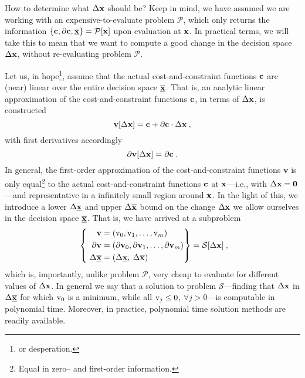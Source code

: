 \documentclass[11pt]{article}
\begin{document}
How to determine what $\Delta \mathbf{x}$ should be? Keep in mind, we have assumed we are working with an expensive-to-evaluate problem $\mathcal{P}$, which only returns the information $\left\{\mathbf{c}, \partial \mathbf{c}, \underline{\overline{\mathbf{x}}}\right\}=\mathcal{P}[\mathbf{x}]$ upon evaluation at $\mathbf{x}$. In practical terms, we will take this to mean that we want to compute a good change in the decision space $\Delta \mathbf{x}$, without re-evaluating problem $\mathcal{P}$.

Let us, in hope\footnote{or desperation.}, assume that the actual cost-and-constraint functions $\mathbf{c}$ are (near) linear over the entire decision space $\underline{\overline{\mathbf{x}}}$. That is, an analytic linear approximation of the cost-and-constraint functions $\mathbf{c}$, in terms of $\Delta \mathbf{x}$, is constructed
\begin{equation}
\textbf{v}[\Delta \mathbf{x}] = \mathbf{c} + \partial \mathbf{c} \cdot  \Delta \mathbf{x}   \:,
\end{equation}
with first derivatives accordingly
\begin{equation}
\partial \textbf{v}[\Delta \mathbf{x}] = \partial \mathbf{c} \:.
\end{equation}
In general, the first-order approximation of the cost-and-constraint functions $\textbf{v}$ is only equal\footnote{Equal in zero-- and first-order information.} to the actual cost-and-constraint functions $\mathbf{c}$ at $\mathbf{x}$---i.e., with $\Delta \mathbf{x}=\textbf{0}$---and representative in a infinitely small region around $\mathbf{x}$. In the light of this, we introduce a lower $\Delta \underline{\mathbf{x}}$ and upper $\Delta \overline{\mathbf{x}}$ bound on the change $\Delta \mathbf{x}$ we allow ourselves in the decision space $\underline{\overline{\mathbf{x}}}$.
That is, we have arrived at a subproblem 
\begin{align}
\label{d:eqn:p}
 ~\left\{ ~
\begin{aligned}
\mathbf{v} &= (\textrm{v}_0, \textrm{v}_1, \ldots, \textrm{v}_m ) \\
\mathbf{\partial v} & = (\mathbf{\partial v}_0 , \mathbf{\partial v}_1 , \ldots,\mathbf{\partial v}_m  ) \\
\Delta \underline{\overline{\mathbf{x}}} & = ( \Delta \underline{\mathbf{x}} , \: \Delta \overline{\mathbf{x}} ) \:
\end{aligned}\right\} =
\mathcal{S} [\Delta \mathbf{x}] \: ,
\end{align}
which is, importantly, unlike problem $\mathcal{P}$, very cheap to evaluate for different values of $\Delta \mathbf{x}$. In general we say that a solution to problem $\mathcal{S}$---finding that $\Delta \mathbf{x}$ in $\Delta \overline{\underline{\mathbf{x}}}$ for which $\textrm{v}_0$ is a minimum, while all $\textrm{v}_j \leq 0$, $\forall j > 0$---is computable in polynomial time. Moreover, in practice, polynomial time solution methods are readily available.
\end{document}
